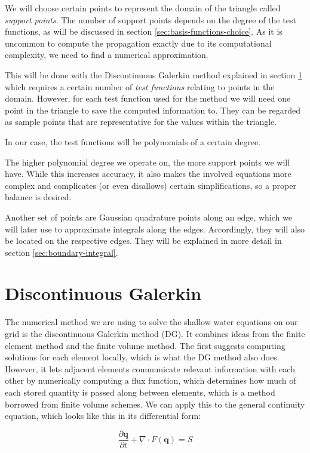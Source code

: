 \documentclass{article}
\newcommand{\pd}[2]{\dfrac{\partial #1}{\partial #2}}
\begin{document}
We will choose certain points to represent the domain of the triangle called \emph{support points}. The number of support points depends on the degree of the test functions, as will be discussed in section \ref{sec:basis-functions-choice}. As it is uncommon to compute the propagation exactly due to its computational complexity, we need to find a numerical approximation.

This will be done with the Discontinuous Galerkin method explained in section \ref{sec:discontinuous-galerkin} which requires a certain number of \emph{test functions} relating to points in the domain. However, for each test function used for the method we will need one point in the triangle to save the computed information to. They can be regarded as sample points that are representative for the values within the triangle.

In our case, the test functions will be polynomials of a certain degree.

The higher polynomial degree we operate on, the more support points we will have. While this increases accuracy, it also makes the involved equations more complex and complicates (or even disallows) certain simplifications, so a proper balance is desired.

Another set of points are Gaussian quadrature points along an edge, which we will later use to approximate integrals along the edges.
Accordingly, they will also be located on the respective edges. They will be explained in more detail in section \ref{sec:boundary-integral}.

\section{Discontinuous Galerkin}
\label{sec:discontinuous-galerkin}

The numerical method we are using to solve the shallow water equations on our grid is the discontinuous Galerkin method (DG). It combines ideas from the finite element method and the finite volume method. The first suggests computing solutions for each element locally, which is what the DG method also does. However, it lets adjacent elements communicate relevant information with each other by numerically computing a flux function, which determines how much of each stored quantity is passed along between elements, which is a method borrowed from finite volume schemes. We can apply this to the general continuity equation, which looks like this in its differential form:

\begin{equation}
  \label{eq:general-continuity-equation}
  \pd{\mathbf{q}}{t} + \nabla \cdot F(\mathbf{q}) = S
\end{equation}
\end{document}
